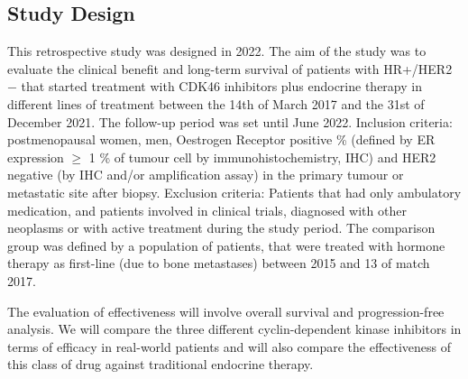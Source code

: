 

\subsection{Study Design}


This retrospective study was designed in 2022. The aim of the study was to evaluate the clinical benefit and long-term survival of patients with HR+/HER2$-$ that started treatment with CDK4\/6 inhibitors plus endocrine therapy in different lines of treatment between the 14th of March 2017 and the 31st of December 2021. The follow-up period was set until June 2022. 
Inclusion criteria:  postmenopausal women, men, Oestrogen Receptor positive \% (defined by ER expression $\geq$ 1 \% of tumour cell by immunohistochemistry, IHC)
and HER2 negative (by IHC and/or amplification assay) in the primary tumour or metastatic site after biopsy.
Exclusion criteria: Patients that had only ambulatory medication, and patients involved in clinical trials, diagnosed with other neoplasms or with active treatment during the study period.
The comparison group was defined by a population of patients, that were treated with hormone therapy as first-line (due to bone metastases) between 2015 and 13 of match 2017.

The evaluation of effectiveness will involve overall survival and progression-free analysis. We will compare the three different cyclin-dependent kinase inhibitors in terms of efficacy in real-world patients and will also compare the effectiveness of this class of drug against traditional endocrine therapy. 



